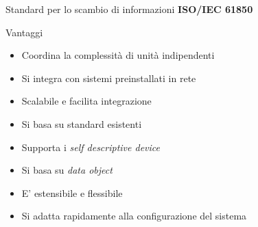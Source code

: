 \begin{frame}{Standard per lo scambio di informazioni}
	\textbf{ISO/IEC 61850}
	\begin{block}{Vantaggi}
	\begin{itemize}[<+- | alert@+>]
		\item Coordina la complessità di unità indipendenti
		\item Si integra con sistemi preinstallati in rete
		\item Scalabile e facilita integrazione
		\item Si basa su standard esistenti
		\item Supporta i \textit{self descriptive device}
		\item Si basa su \textit{data object}
		\item E' estensibile e flessibile
		\item Si adatta rapidamente alla configurazione del sistema
	\end{itemize}
	\end{block}
\end{frame}



